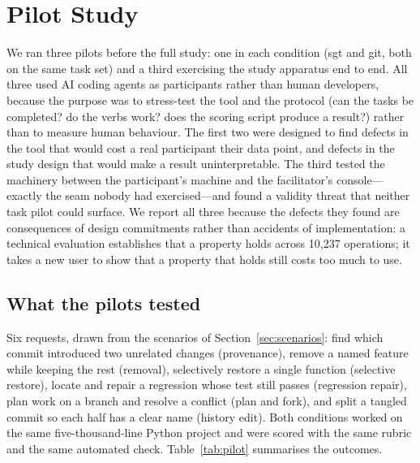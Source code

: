 \section{Pilot Study}
\label{sec:pilot}

We ran three pilots before the full study: one in each condition (sgt and git,
both on the same task set) and a third exercising the study apparatus end to end.
All three used AI coding agents as participants rather than human developers,
because the purpose was to stress-test the tool and the protocol (can the tasks
be completed? do the verbs work? does the scoring script produce a result?) rather
than to measure human behaviour. The first two were designed to find defects in
the tool that would cost a real participant their data point, and defects in the
study design that would make a result uninterpretable. The third tested the
machinery between the participant's machine and the facilitator's console---exactly
the seam nobody had exercised---and found a validity threat that neither task pilot
could surface.
We report all three because the defects they found are consequences of design
commitments rather than accidents of implementation: a technical evaluation
establishes that a property holds across 10{,}237 operations; it takes a new
user to show that a property that holds still costs too much to use.

\subsection{What the pilots tested}

Six requests, drawn from the scenarios of Section~\ref{sec:scenarios}: find
which commit introduced two unrelated changes (provenance), remove a named
feature while keeping the rest (removal), selectively restore a single function
(selective restore), locate and repair a regression whose test still passes
(regression repair), plan work on a branch and resolve a conflict (plan and
fork), and split a tangled commit so each half has a clear name (history edit).
Both conditions worked on the same five-thousand-line Python project and were
scored with the same rubric and the same automated check.
Table~\ref{tab:pilot} summarises the outcomes.

